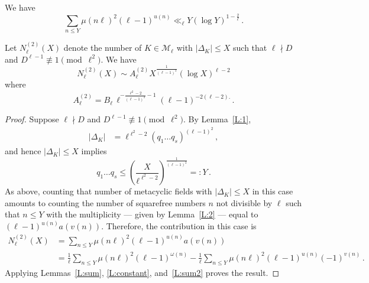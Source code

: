 \documentclass[10pt,a4paper]{amsart}
\begin{document}
\begin{lemma}\label{L:sum2}
We have
$$
\sum_{n \leq Y}
\mu(n\ell)^2(\ell-1)^{u(n)}
\ll_\ell
Y(\log Y)^{1-\frac{2}{\ell}}
\,.
$$
\end{lemma}

\begin{prop}\label{P:2}
Let $N_\ell^{(2)}(X)$ denote the number of $K\in\mathcal{M}_\ell$ 
with $|\Delta_K|\leq X$ such that $\ell\nmid D$ and $D^{\ell-1}\not\equiv 1\pmod{\ell^2}$.
We have
$$N_\ell^{(2)}(X)\sim A_\ell^{(2)} X^{\frac{1}{(\ell-1)^2}}(\log X)^{\ell-2}$$
where
$$
  A_\ell^{(2)}=B_{\ell}\,\ell^{-\frac{\ell^2-2}{(\ell-1)^2}-1}(\ell-1)^{-2(\ell-2).}
  \,.
$$
\end{prop}

\begin{proof}
Suppose $\ell\nmid D$
and
$D^{\ell-1}\not\equiv 1\pmod{\ell^2}$.
By Lemma~\ref{L:1},
\begin{align*}
|\Delta_K| &= \ell^{\ell^2-2}(q_1 \dots q_s)^{(\ell-1)^2}
\,,
\end{align*}
and hence $|\Delta_K|\leq X$ implies
$$
  q_1\dots q_s\leq \left(\frac{X}{\ell^{\ell^2-2}}\right)^{\frac{1}{(\ell-1)^2}}=:Y
  \,.
$$
As above, counting that number of metacyclic fields with $|\Delta_K|\leq X$ in this case
amounts to counting the number of squarefree numbers $n$ not divisible by $\ell$
such that $n\leq Y$ with the multiplicity
--- given by Lemma~\ref{L:2} --- equal to $(\ell-1)^{u(n)}a(v(n))$. 
Therefore, the contribution in this case is
\begin{align*}
  N_\ell^{(2)}(X)&=\sum_{n\leq Y} \mu(n\ell)^2(\ell-1)^{u(n)}a(v(n))
\\
&=
\frac{1}{\ell}
\sum_{n\leq Y} \mu(n\ell)^2(\ell-1)^{\omega(n)}
-
\frac{1}{\ell}
\sum_{n\leq Y} \mu(n\ell)^2(\ell-1)^{u(n)}
(-1)^{v(n)}
\,.
\end{align*}
Applying Lemmas~\ref{L:sum}, \ref{L:constant}, and~\ref{L:sum2} proves the result.
\end{proof}
\end{document}
